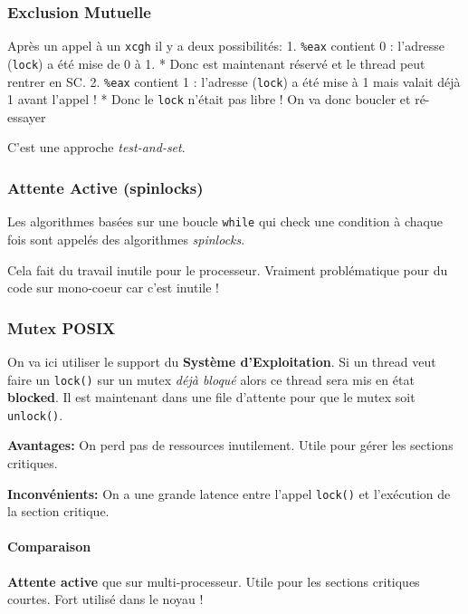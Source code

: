 \subsubsection{Exclusion Mutuelle}\label{exclusion-mutuelle}

Après un appel à un \texttt{xcgh} il y a deux possibilités: 1.
\texttt{\%eax} contient 0 : l'adresse (\texttt{lock}) a été mise de 0 à
1. * Donc est maintenant réservé et le thread peut rentrer en SC. 2.
\texttt{\%eax} contient 1 : l'adresse (\texttt{lock}) a été mise à 1
mais valait déjà 1 avant l'appel ! * Donc le \texttt{lock} n'était pas
libre ! On va donc boucler et ré-essayer

C'est une approche \emph{test-and-set}.

\subsubsection{Attente Active
(spinlocks)}\label{attente-active-spinlocks}

Les algorithmes basées sur une boucle \texttt{while} qui check une
condition à chaque fois sont appelés des algorithmes \emph{spinlocks}.

Cela fait du travail inutile pour le processeur. Vraiment problématique
pour du code sur mono-coeur car c'est inutile !

\subsubsection{Mutex POSIX}\label{mutex-posix}

On va ici utiliser le support du \textbf{Système d'Exploitation}. Si un
thread veut faire un \texttt{lock()} sur un mutex \emph{déjà bloqué}
alors ce thread sera mis en état \textbf{blocked}. Il est maintenant
dans une file d'attente pour que le mutex soit \texttt{unlock()}.

\textbf{Avantages:} On perd pas de ressources inutilement. Utile pour
gérer les sections critiques.

\textbf{Inconvénients:} On a une grande latence entre l'appel
\texttt{lock()} et l'exécution de la section critique.

\paragraph{Comparaison}\label{comparaison}

\textbf{Attente active} que sur multi-processeur. Utile pour les
sections critiques courtes. Fort utilisé dans le noyau !

